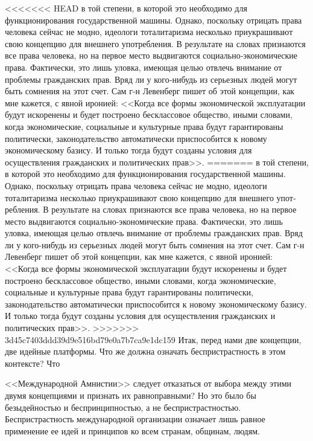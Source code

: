 \documentclass{book}
\begin{document}
{<<<<<<< HEAD
в той степени, в которой это необходимо для функционирова­ния государственной машины. Однако, поскольку отрицать права человека сейчас не модно, идеологи тоталитаризма не­сколько приукрашивают свою концепцию для внешнего упот­ребления. В результате на словах признаются все права челове­ка, но на первое место выдвигаются социально‑экономиче­ские права. Фактически, это лишь уловка, имеющая целью от­влечь внимание от проблемы гражданских прав. Вряд ли у ко­го‑нибудь из серьезных людей могут быть сомнения на этот счет. Сам г‑н Левенберг пишет об этой концепции, как мне ка­жется, с явной иронией: <<Когда все формы экономической эксплуатации будут искоренены и будет построено бесклассо­вое общество, иными словами, когда экономические, социаль­ные и культурные права будут гарантированы политически, законодательство автоматически приспособится к новому экономическому базису. И только тогда будут созданы условия для осуществления гражданских и политических прав>>.
=======
в той степени, в которой это необходимо для функционирова­ния государственной машины. Однако, поскольку отрицать права человека сейчас не модно, идеологи тоталитаризма не­сколько приукрашивают свою концепцию для внешнего упот­ребления. В результате на словах признаются все права челове­ка, но на первое место выдвигаются социально-экономиче­ские права. Фактически, это лишь уловка, имеющая целью от­влечь внимание от проблемы гражданских прав. Вряд ли у ко­го-нибудь из серьезных людей могут быть сомнения на этот счет. Сам г-н Левенберг пишет об этой концепции, как мне ка­жется, с явной иронией: <<Когда все формы экономической эксплуатации будут искоренены и будет построено бесклассо­вое общество, иными словами, когда экономические, социаль­ные и культурные права будут гарантированы политически, законодательство автоматически приспособится к новому экономическому базису. И только тогда будут созданы условия для осуществления гражданских и политических прав>>.
>>>>>>> 3d45c7403ddd39d9e516bd79e0a7b7ca9e1dc159
Итак, перед нами две концепции, две идейные платформы. Что же должна означать беспристрастность в этом контексте? Что 

<<Международной Амнистии>> следует отказаться от выбора между этими двумя концепциями и признать их равноправны­ми? Но это было бы безыдейностью и беспринципностью, а не беспристрастностью. Беспристрастность международной органи­зации означает лишь равное применение ее идей и принципов ко всем странам, общинам, людям.

}
\end{document}

